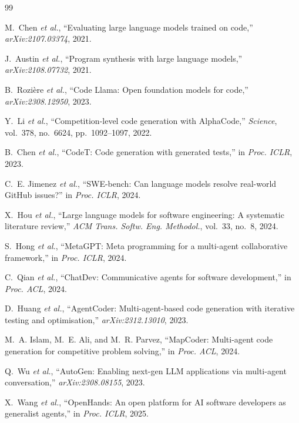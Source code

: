 \documentclass[conference,letterpaper]{IEEEtran}
\begin{document}
\balance
\begin{thebibliography}{99}
\footnotesize

M.~Chen \emph{et al.}, ``Evaluating large language models trained on code,''
\emph{arXiv:2107.03374}, 2021.

J.~Austin \emph{et al.}, ``Program synthesis with large language models,''
\emph{arXiv:2108.07732}, 2021.

B.~Rozi\`ere \emph{et al.}, ``Code Llama: Open foundation models for code,''
\emph{arXiv:2308.12950}, 2023.

Y.~Li \emph{et al.}, ``Competition-level code generation with AlphaCode,''
\emph{Science}, vol.~378, no.~6624, pp.~1092--1097, 2022.

B.~Chen \emph{et al.}, ``CodeT: Code generation with generated tests,'' in
\emph{Proc. ICLR}, 2023.

C.~E. Jimenez \emph{et al.}, ``SWE-bench: Can language models resolve real-world
GitHub issues?'' in \emph{Proc. ICLR}, 2024.

X.~Hou \emph{et al.}, ``Large language models for software engineering: A
systematic literature review,'' \emph{ACM Trans. Softw. Eng. Methodol.}, vol.~33,
no.~8, 2024.

S.~Hong \emph{et al.}, ``MetaGPT: Meta programming for a multi-agent
collaborative framework,'' in \emph{Proc. ICLR}, 2024.

C.~Qian \emph{et al.}, ``ChatDev: Communicative agents for software
development,'' in \emph{Proc. ACL}, 2024.

D.~Huang \emph{et al.}, ``AgentCoder: Multi-agent-based code generation with
iterative testing and optimisation,'' \emph{arXiv:2312.13010}, 2023.

M.~A. Islam, M.~E. Ali, and M.~R. Parvez, ``MapCoder: Multi-agent code
generation for competitive problem solving,'' in \emph{Proc. ACL}, 2024.

Q.~Wu \emph{et al.}, ``AutoGen: Enabling next-gen LLM applications via
multi-agent conversation,'' \emph{arXiv:2308.08155}, 2023.

X.~Wang \emph{et al.}, ``OpenHands: An open platform for AI software developers
as generalist agents,'' in \emph{Proc. ICLR}, 2025.


\end{thebibliography}
\end{document}
